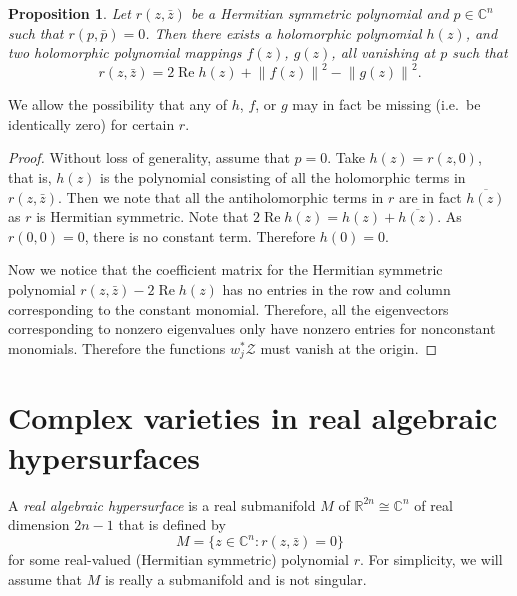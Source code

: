 \documentclass[12pt,openany]{book}
\renewcommand{\Re}{\operatorname{Re}}
\newcommand{\norm}[1]{\left\lVert {#1} \right\rVert}
\newcommand{\C}{{\mathbb{C}}}
\newcommand{\R}{{\mathbb{R}}}
\newcommand{\sZ}{{\mathcal{Z}}}
\newcommand{\myindex}[1]{#1\index{#1}}
\newcommand{\sectionnewpage}{}
\theoremstyle{plain}
\newtheorem{prop}[thm]{Proposition}
\theoremstyle{remark}
\theoremstyle{definition}
\theoremstyle{exercise}
\theoremstyle{example}
\begin{document}
\begin{prop} \label{prop:holdecpoly}
Let $r(z,\bar{z})$ be a Hermitian symmetric polynomial and
$p \in \C^n$ such that
$r(p,\bar{p}) = 0$.  Then there exists a holomorphic polynomial $h(z)$,
and two holomorphic polynomial mappings
$f(z)$,
$g(z)$, all vanishing at $p$ such that
\begin{equation}
r(z,\bar{z}) = 2 \Re h(z) + \norm{f(z)}^2-\norm{g(z)}^2 .
\end{equation}
\end{prop}

We allow the possibility that any of $h$, $f$, or $g$ may
in fact be missing (i.e.\ be identically zero) for certain $r$.

\begin{proof}
Without loss of generality, assume that $p=0$.  Take $h(z) = r(z,0)$,
that is, $h(z)$ is the
polynomial consisting of all the holomorphic terms in $r(z,\bar{z})$.  Then
we note that all the antiholomorphic terms in $r$ are in fact
$\overline{h(z)}$ as $r$ is Hermitian symmetric.  Note that
$2 \Re h(z) = h(z) + \overline{h(z)}$.  As $r(0,0) = 0$,
there is no constant term.  Therefore $h(0) = 0$.

Now we notice that the coefficient matrix for the
Hermitian symmetric polynomial $r(z,\bar{z}) - 2 \Re h(z)$
has no entries in the row and column corresponding to the constant monomial.
Therefore, all the eigenvectors corresponding to nonzero
eigenvalues only have nonzero entries for nonconstant monomials.  Therefore
the functions $w_j^* \sZ$ must vanish at the origin.
\end{proof}


\sectionnewpage
\section{Complex varieties in real algebraic hypersurfaces}
\label{sec:curvinalg}

A \emph{\myindex{real algebraic hypersurface}} is a real submanifold $M$
of $\R^{2n} \cong \C^n$ of real dimension $2n-1$ that is defined
by
\begin{equation*}
M = \{ z \in \C^n : r(z,\bar{z}) = 0 \}
\end{equation*}
for some real-valued (Hermitian symmetric)
polynomial $r$.  For simplicity, we will assume that $M$ is really a
submanifold and is not singular.
\end{document}
